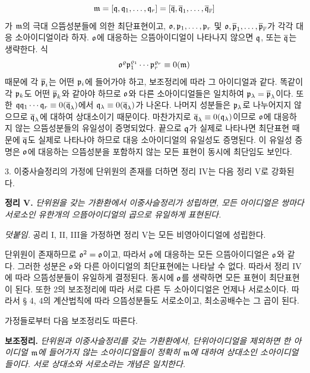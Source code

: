 \[
\mathfrak{m}=[\mathfrak{q},\mathfrak{q}_1,\ldots,\mathfrak{q}_r]
   =[\overline{\mathfrak{q}},\overline{\mathfrak{q}}_1,\ldots,\overline{\mathfrak{q}}_{\overline r}]
\]
가 \(\mathfrak{m}\)의 극대 으뜸성분들에 의한 최단표현이고, \(\mathfrak{o},\mathfrak{p}_1,\ldots,\mathfrak{p}_r\) 및 \(\mathfrak{o},\overline{\mathfrak{p}}_1,\ldots,\overline{\mathfrak{p}}_{\overline r}\)가 각각 대응 소아이디얼이라 하자. \(\mathfrak{o}\)에 대응하는 으뜸아이디얼이 나타나지 않으면 \(\mathfrak{q}\), 또는 \(\overline{\mathfrak{q}}\)는 생략한다. 식
\[
        \mathfrak{o}^\varrho\mathfrak{p}_1^{\varrho_1}\cdots\mathfrak{p}_r^{\varrho_r}
        \equiv0(\mathfrak{m})
\]
때문에 각 \(\overline{\mathfrak{p}}_i\)는 어떤 \(\mathfrak{p}_i\)에 들어가야 하고, 보조정리에 따라 그 아이디얼과 같다. 똑같이 각 \(\mathfrak{p}_k\)도 어떤 \(\overline{\mathfrak{p}}_k\)와 같아야 하므로 \(\mathfrak{o}\)와 다른 소아이디얼들은 일치하여 \(\mathfrak{p}_\lambda=\overline{\mathfrak{p}}_\lambda\)이다. 또한 \(\mathfrak{q}\mathfrak{q}_1\cdots\mathfrak{q}_r\equiv0(\overline{\mathfrak{q}}_\lambda)\)에서 \(\mathfrak{q}_\lambda\equiv0(\overline{\mathfrak{q}}_\lambda)\)가 나온다. 나머지 성분들은 \(\mathfrak{p}_\lambda\)로 나누어지지 않으므로 \(\overline{\mathfrak{q}}_\lambda\)에 대하여 상대소이기 때문이다. 마찬가지로 \(\overline{\mathfrak{q}}_\lambda\equiv0(\mathfrak{q}_\lambda)\)이므로 \(\mathfrak{o}\)에 대응하지 않는 으뜸성분들의 유일성이 증명되었다. 끝으로 \(\mathfrak{q}\)가 실제로 나타나면 최단표현 때문에 \(\overline{\mathfrak{q}}\)도 실제로 나타나야 하므로 대응 소아이디얼의 유일성도 증명된다. 이 유일성 증명은 \(\mathfrak{o}\)에 대응하는 으뜸성분을 포함하지 않는 모든 표현이 동시에 최단임도 보인다.

3. 이중사슬정리의 가정에 단위원의 존재를 더하면 정리 IV는 다음 정리 V로 강화된다.

\textbf{정리 V.} \emph{단위원을 갖는 가환환에서 이중사슬정리가 성립하면, 모든 아이디얼은 쌍마다 서로소인 유한개의 으뜸아이디얼의 곱으로 유일하게 표현된다.}

\emph{덧붙임.} 공리 I, II, III을 가정하면 정리 V는 모든 비영아이디얼에 성립한다.

단위원이 존재하므로 \(\mathfrak{o}^2=\mathfrak{o}\)이고, 따라서 \(\mathfrak{o}\)에 대응하는 모든 으뜸아이디얼은 \(\mathfrak{o}\)와 같다. 그러한 성분은 \(\mathfrak{o}\)와 다른 아이디얼의 최단표현에는 나타날 수 없다. 따라서 정리 IV에 따라 으뜸성분들이 유일하게 결정된다. 동시에 \(\mathfrak{o}\)를 생략하면 모든 표현이 최단표현이 된다. 또한 2의 보조정리에 따라 서로 다른 두 소아이디얼은 언제나 서로소이다. 따라서 § 4, 4의 계산법칙에 따라 으뜸성분들도 서로소이고, 최소공배수는 그 곱이 된다.

가정들로부터 다음 보조정리도 따른다.

\textbf{보조정리.} \emph{단위원과 이중사슬정리를 갖는 가환환에서, 단위아이디얼을 제외하면 한 아이디얼 \(\mathfrak{m}\)에 들어가지 않는 소아이디얼들이 정확히 \(\mathfrak{m}\)에 대하여 상대소인 소아이디얼들이다. 서로 상대소와 서로소라는 개념은 일치한다.}

